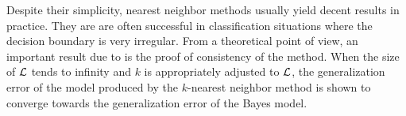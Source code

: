 Despite their simplicity, nearest neighbor methods usually yield decent
results in practice. They are are often successful in classification situations
where the decision boundary is very irregular. From a theoretical point of
view, an important result due to \citet{cover:1967} is the proof of consistency
of the method. When the size of ${\cal L}$ tends to infinity and $k$ is
appropriately adjusted to ${\cal L}$, the generalization error of the model
produced by the $k$-nearest neighbor method is shown to converge towards the
generalization error of the Bayes model.
